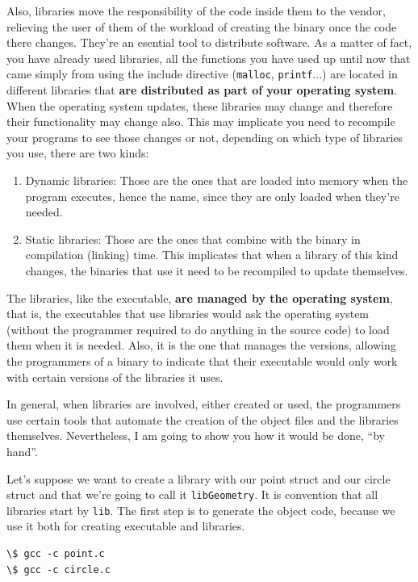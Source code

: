 \documentclass[a4paper]{article}
\begin{document}
Also, libraries move the responsibility of the code inside them to the vendor,
relieving the user of them of the workload of creating the binary once the code
there changes. They're an esential tool to distribute software. As a matter of
fact, you have already used libraries, all the functions you have used up until
now that came simply from using the include directive (\verb!malloc!,
\verb!printf!...) are located in different libraries that \textbf{are
distributed as part of your operating system}. When the operating system
updates, these libraries may change and therefore their functionality may change
also. This may implicate you need to recompile your programs to see those
changes or not, depending on which type of libraries you use, there are two
kinds:

\begin{enumerate}
\item Dynamic libraries: Those are the ones that are loaded into memory when
the program executes, hence the name, since they are only loaded when they're
needed.
\item Static libraries: Those are the ones that combine with the binary in
compilation (linking) time. This implicates that when a library of this kind
changes, the binaries that use it need to be recompiled to update themselves.
\end{enumerate}

The libraries, like the executable, \textbf{are managed by the operating
system}, that is, the executables that use libraries would ask the operating
system (without the programmer required to do anything in the source code) to
load them when it is needed. Also, it is the one that manages the versions,
allowing the programmers of a binary to indicate that their executable would
only work with certain versions of the libraries it uses.

In general, when libraries are involved, either created or used, the programmers
use certain tools that automate the creation of the object files and the
libraries themselves. Nevertheless, I am going to show you how it would be done,
``by hand''.

Let's suppose we want to create a library with our point struct and our circle
struct and that we're going to call it \verb!libGeometry!. It is convention that
all libraries start by \verb!lib!. The first step is to generate the object
code, because we use it both for creating executable and libraries.
\begin{lstlisting}[style=terminalStyle]
\$ gcc -c point.c
\$ gcc -c circle.c
\end{lstlisting}
\end{document}
